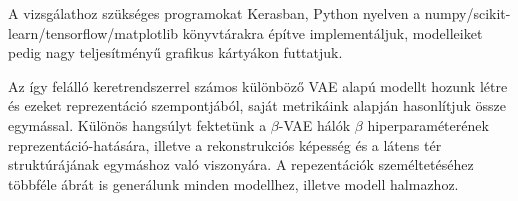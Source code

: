 A vizsgálathoz szükséges programokat Kerasban, Python nyelven a numpy/scikit-learn/tensorflow/matplotlib könyvtárakra építve implementáljuk, modelleiket pedig nagy teljesítményű grafikus kártyákon futtatjuk. 

Az így felálló keretrendszerrel számos különböző VAE alapú modellt hozunk létre és ezeket reprezentáció szempontjából, saját metrikáink alapján hasonlítjuk össze egymással. Különös hangsúlyt fektetünk a $\beta$-VAE hálók $\beta$ hiperparaméterének reprezentáció-hatására, illetve a rekonstrukciós képesség és a látens tér struktúrájának egymáshoz való viszonyára. A repezentációk személtetéséhez többféle ábrát is generálunk minden modellhez, illetve modell halmazhoz.
\vfill


